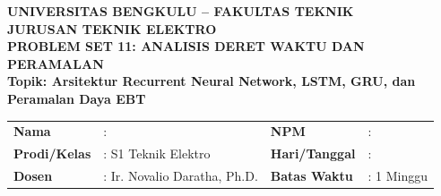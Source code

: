 \documentclass[11pt,a4paper]{article}
\begin{document}
\begin{center}
    {\large \textbf{\color{primaryblue}UNIVERSITAS BENGKULU -- FAKULTAS TEKNIK}}\\[0.1cm]
    {\large \textbf{\color{secondaryblue}JURUSAN TEKNIK ELEKTRO}}\\[0.2cm]
    {\LARGE \textbf{\color{primaryblue}PROBLEM SET 11: ANALISIS DERET WAKTU DAN PERAMALAN}}\\[0.1cm]
    {\normalsize \textbf{Topik: Arsitektur Recurrent Neural Network, LSTM, GRU, dan Peramalan Daya EBT}}
\end{center}

\vspace{0.1cm}

\begin{tcolorbox}[colback=boxbg,colframe=primaryblue,arc=2mm,title=\textbf{Informasi Tugas \& Identitas Mahasiswa}]
\small
\begin{tabular}{p{2.2cm}p{5.5cm}p{2.2cm}p{5.0cm}}
\textbf{Nama} & : \dotfill & \textbf{NPM} & : \dotfill \\
\textbf{Prodi/Kelas} & : S1 Teknik Elektro & \textbf{Hari/Tanggal} & : \dotfill \\
\textbf{Dosen} & : Ir. Novalio Daratha, Ph.D. & \textbf{Batas Waktu} & : 1 Minggu \\
\end{tabular}
\end{tcolorbox}

\vspace{0.2cm}
\end{document}
